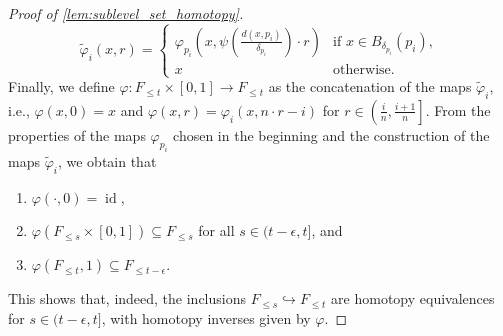 \begin{proof}[Proof of \cref{lem:sublevel_set_homotopy}]
	\[
		\tilde{\varphi}_{i}(x,r) =
		\begin{cases}
			\varphi_{p_{i}} \left( x, \psi \left( \frac{d(x,p_{i})}{\delta_{p_{i}}} \right) \cdot r \right)  & \text{if } x \in B_{\delta_{p_{i}}}(p_{i}), \\
			x & \text{otherwise}.
		\end{cases}
	\]
	Finally, we define $\varphi \colon F_{\leq t} \times [0,1] \to F_{\leq t}$ as the concatenation of the maps $\tilde{\varphi}_{i}$, i.e., $\varphi(x,0) = x$ and $\varphi(x,r) = \varphi_{i} \left( x, n \cdot r - i \right)$ for $r \in \left( \frac{i}{n}, \frac{i+1}{n} \right]$.
	From the properties of the maps $\varphi_{p_{i}}$ chosen in the beginning and the construction of the maps $\tilde{\varphi}_{i}$, we obtain that
	\begin{enumerate}
		\item $\varphi(\cdot, 0) = \operatorname{id}$,
		\item $\varphi(F_{\leq s} \times [0,1]) \subseteq F_{\leq s}$ for all $s \in (t - \epsilon, t]$, and
		\item $\varphi(F_{\leq t}, 1) \subseteq F_{\leq t - \epsilon}$.
	\end{enumerate}
	This shows that, indeed, the inclusions $F_{\leq s} \hookrightarrow F_{\leq t}$ are homotopy equivalences for $s \in (t - \epsilon, t]$, with homotopy inverses given by $\varphi$.
\end{proof}
